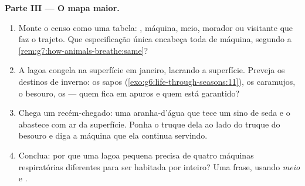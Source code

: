 \begin{problem}
\medskip\noindent\textbf{Parte III --- O mapa maior.}
\begin{enumerate}[resume]
  \item Monte o censo como uma tabela: , máquina, meio, morador
        ou visitante que faz o trajeto. Que especificação única
        encabeça toda  de máquina, segundo a
        \cref{rem:g7:how-animals-breathe:same}?
  \item A lagoa congela na superfície em janeiro, lacrando a
        superfície. Preveja os destinos de inverno: os sapos
        (\cref{exo:g6:life-through-seasons:11}), os caramujos, o
        besouro, os  --- quem fica em apuros e quem está
        garantido?
  \item Chega um recém-chegado: uma aranha-d'água que tece um sino de
        seda e o abastece com ar da superfície. Ponha o truque dela ao
        lado do truque do besouro e diga a máquina que ela continua
        servindo.
  \item Conclua: por que uma lagoa pequena precisa de quatro máquinas
        respiratórias diferentes para ser habitada por inteiro? Uma
        frase, usando \emph{meio} e \emph{}.
\end{enumerate}
\end{problem}
